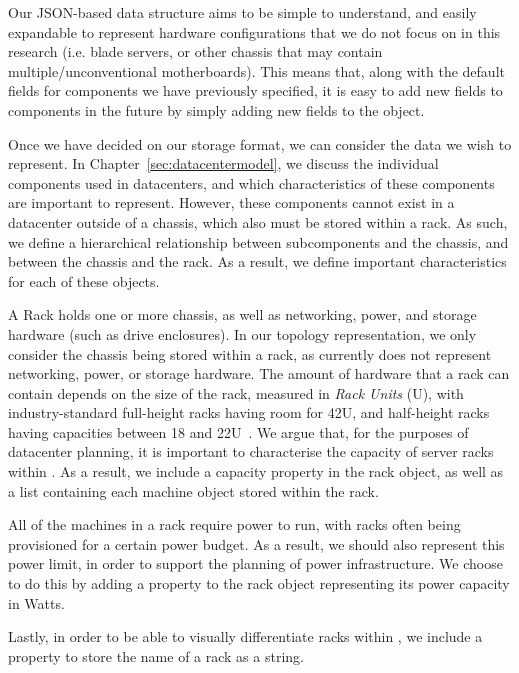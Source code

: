 \documentclass[11pt]{article}
\begin{document}
			Our JSON-based data structure aims to be simple to understand, and easily expandable to represent hardware configurations that we do not focus on in this research (i.e. blade servers, or other chassis that may contain multiple/unconventional motherboards).
			This means that, along with the default fields for components we have previously specified, it is easy to add new fields to components in the future by simply adding new fields to the object.

			\bigbreak

			Once we have decided on our storage format, we can consider the data we wish to represent. 
			In Chapter~\ref{sec:datacentermodel}, we discuss the individual components used in datacenters, and which characteristics of these components are important to represent.
			However, these components cannot exist in a datacenter outside of a chassis, which also must be stored within a rack.
			As such, we define a hierarchical relationship between subcomponents and the chassis, and between the chassis and the rack.
			As a result, we define important characteristics for each of these objects.

			A Rack holds one or more chassis, as well as networking, power, and storage hardware (such as drive enclosures).
			In our topology representation, we only consider the chassis being stored within a rack, as \opendc{} currently does not represent networking, power, or storage hardware.
			The amount of hardware that a rack can contain depends on the size of the rack, measured in \textit{Rack Units} (U), with industry-standard full-height racks having room for 42U, and half-height racks having capacities between 18 and 22U~\cite{Dean2018}. 
			We argue that, for the purposes of datacenter planning, it is important to characterise the capacity of server racks within \opendc{}.
			As a result, we include a capacity property in the rack object, as well as a list containing each machine object stored within the rack.

			All of the machines in a rack require power to run, with racks often being provisioned for a certain power budget.
			As a result, we should also represent this power limit, in order to support the planning of power infrastructure.
			We choose to do this by adding a property to the rack object representing its power capacity in Watts.

			Lastly, in order to be able to visually differentiate racks within \opendc{}, we include a property to store the name of a rack as a string.
\end{document}
